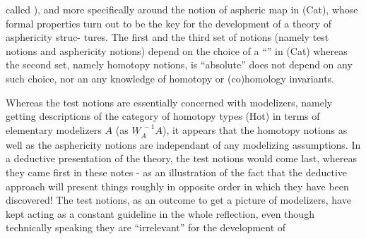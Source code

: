 called  \hand{\uline{\textcolor{black}{asphericity}}} \hand{\uline{\textcolor{black}{structure}}} ),  and more specifically around the
notion of  aspheric map in (Cat),  whose formal properties turn out to be
the  key for the development of a theory of asphericity struc-%
tures.  The first and the third set of notions  (namely test notions  and
asphericity notions)  depend on the choice of a ``\hand{\uline{\textcolor{black}{basic localizer}}}''  in (Cat)\hand{,}
whereas the second set,  namely homotopy notions,  is ``absolute'' 
does not depend on any such choice,  nor an any knowledge of homotopy or
(co)homology invariants.

Whereas the test notions are essentially concerned with modelizers,
namely getting descriptions of the category of homotopy types (Hot)  in
terms of elementary modelizers $A\hat{}$ (as  $\underline{W}_A^{\ -1}A\hat{}$),  it appears that the
homotopy notions\hand{,} as well as the asphericity notions\hand{,} are independant of
any modelizing  assumptions.  In a deductive presentation of the theory,
the %
test notions would come last,  whereas they came first in these notes
-  as an illustration of the  fact that the deductive approach will present
things roughly in opposite order in which they have been discovered!  The
test notions,  as an outcome  to get a picture of modelizers,  have kept
acting as a constant  guideline in the whole reflection,  even
though technically speaking they are ``irrelevant'' for the development of
